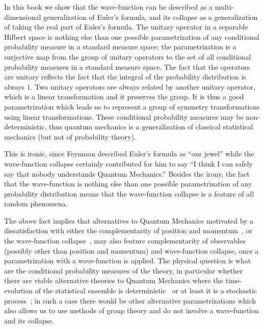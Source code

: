 \documentclass[11pt]{book}
\begin{document}
In this book we show that the wave-function can be described as a
multi-dimensional generalization of Euler's formula, and its collapse as
a generalization of taking the real part of Euler's formula. The unitary
operator in a separable Hilbert space is nothing else than one possible
parametrization of any conditional probability measure in a standard
measure space; the parametrization is a surjective map from the group of
unitary operators to the set of all conditional probability measures in
a standard measure space. The fact that the operators are unitary
reflects the fact that the integral of the probability distribution is
always \(1\). Two unitary operators are always related by another
unitary operator, which is a linear transformation and it preserves the
group. It is thus a good parametrization which leads us to represent a
group of symmetry transformations using linear transformations. These
conditional probability measures may be non-deterministic, thus quantum
mechanics is a generalization of classical statistical mechanics (but
not of probability theory).

This is ironic, since Feynman described Euler's formula as ``our jewel''
while the wave-function collapse certainly contributed for him to say
``I think I can safely say that nobody understands Quantum Mechanics.''
Besides the irony, the fact that the wave-function is nothing else than
one possible parametrization of any probability distribution means that
the wave-function collapse is a feature of all random phenomena.

The above fact implies that alternatives to Quantum Mechanics motivated
by a dissatisfaction with either the complementarity of position and
momentum~\cite{BALLENTINE1970statistical}, or the wave-function
collapse~\cite{Weinberg2016Lindblad}, may also feature complementarity of observables (possibly other
than position and momentum) and wave-function collapse, once a
parametrization with a wave-function is applied. The physical question
is what are the conditional probability measures of the theory, in
particular whether there are viable alternative theories to Quantum
Mechanics where the time-evolution of the statistical ensemble is
deterministic~\cite{Hooft2014Cellular}
or at least it is a stochastic
process~\cite{Nelson2012Review}\cite{Weinberg2016What}\cite{Kubo1963Stochastic}; in such
a case there would be other alternative parametrizations which also
allows us to use methods of group theory and do not involve a
wave-function and its collapse.
\end{document}
